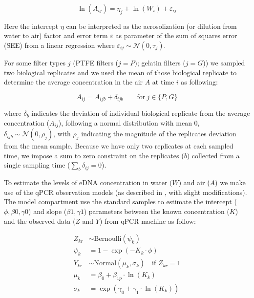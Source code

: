 \documentclass{article}
\begin{document}
\begin{equation}
\ln(A_{ij}) = \eta_{j} + \ln(W_{i}) + \varepsilon_{ij}
\end{equation}

Here the intercept $\eta$ can be interpreted as the aerosolization (or dilution from water to air) factor and error term $\varepsilon$ as parameter of the sum of squares error (SEE) from a linear regression where $\varepsilon_{ij} \sim \mathcal{N}(0,\tau_j)$.

For some filter types $j$ (PTFE filters (${j=P})$; gelatin filters (${j=G}$)) we sampled two biological replicates and we used the mean of those biological replicate to determine the average concentration in the air $A$ at time $i$ as following:

\begin{equation}
A_{ij} = A_{ijb} + \delta_{ijb} \qquad \text{for} \ j \in \{P,G\}
\end{equation}


where $\delta_b$ indicates the deviation of individual biological replicate from the average concentration ($A_{ij}$), following a normal distribution with mean 0, $\delta_{ijb} \sim \mathcal{N}(0,\rho_j)$, with $\rho_j$ indicating the magnitude of the replicates deviation from the mean sample. Because we have only two replicates at each sampled time, we impose a sum to zero constraint on the replicates ($b$) collected from a single sampling time ($\sum_b \delta_{ij} = 0$).

To estimate the levels of eDNA concentration in water ($W$) and air ($A$) we make use of the qPCR observation models (as described in \cite{guri2024, shelton2022}, with slight modifications). The model compartment use the standard samples to estimate the intercept ($\phi,\beta0,\gamma0$) and slope ($\beta1, \gamma1$) parameters between the known concentration ($K$) and the observed data ($Z$ and $Y$) from qPCR machine as follow:

\begin{align}
    Z_{kr} &\sim \mathrm{Bernoulli} \left(\psi_{k}\right)  \\
    \psi_{k} &= 1 - \exp(-K_{k} \cdot \phi) \\
    Y_{kr} &\sim \mathrm{Normal} (\mu_{k}, \sigma_{k}) \quad \text{if } Z_{kr} = 1 \\
    \mu_{k} &= \beta_0 + \beta_{1p} \cdot \ln (K_{k}) \\
    \sigma_{k} &= \exp(\gamma_0 + \gamma_1 \cdot \ln (K_{k}))
\end{align}
\end{document}
